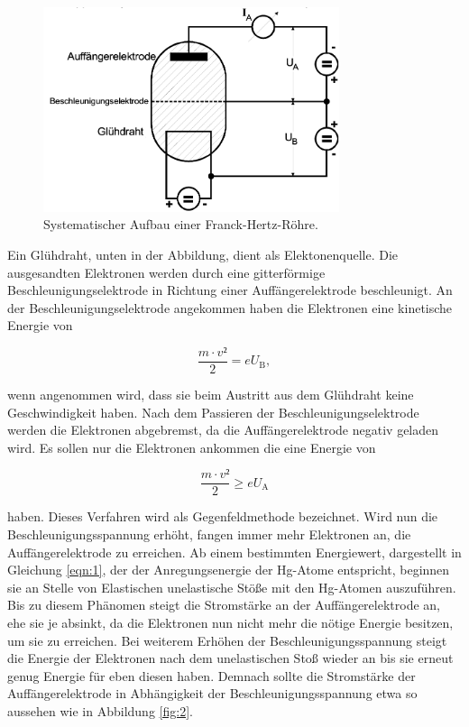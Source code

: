 \begin{figure}[H]
  \centering
  \includegraphics[height=6cm]{ressources/aufbau.png}
  \caption{Systematischer Aufbau einer Franck-Hertz-Röhre. \cite{skript}}
  \label{fig:1}
\end{figure}

Ein Glühdraht, unten in der Abbildung, dient als Elektonenquelle.
Die ausgesandten Elektronen werden durch eine gitterförmige Beschleunigungselektrode in Richtung einer Auffängerelektrode beschleunigt.
An der Beschleunigungselektrode angekommen haben die Elektronen eine kinetische Energie von

\begin{equation}
  \frac{m \cdot v²}{2} = eU_{\text{B}}, \label{eqn:3}
\end{equation}

wenn angenommen wird, dass sie beim Austritt aus dem Glühdraht keine Geschwindigkeit haben.
Nach dem Passieren der Beschleunigungselektrode werden die Elektronen abgebremst, da die Auffängerelektrode negativ geladen wird.
Es sollen nur die Elektronen ankommen die eine Energie von

\begin{equation}
  \frac{m \cdot v²}{2} \ge eU_{\text{A}} \label{eqn:4}
\end{equation}

haben.
Dieses Verfahren wird als Gegenfeldmethode bezeichnet.
Wird nun die Beschleunigungsspannung erhöht, fangen immer mehr Elektronen an, die Auffängerelektrode zu erreichen.
Ab einem bestimmten Energiewert, dargestellt in Gleichung \ref{eqn:1}, der der Anregungsenergie der Hg-Atome entspricht, beginnen sie an Stelle von Elastischen unelastische Stöße mit den Hg-Atomen auszuführen.
Bis zu diesem Phänomen steigt die Stromstärke an der Auffängerelektrode an, ehe sie je absinkt, da die Elektronen nun nicht mehr die nötige Energie besitzen, um sie zu erreichen.
Bei weiterem Erhöhen der Beschleunigungsspannung steigt die Energie der Elektronen nach dem unelastischen Stoß wieder an bis sie erneut genug Energie für eben diesen haben.
Demnach sollte die Stromstärke der Auffängerelektrode in Abhängigkeit der Beschleunigungsspannung etwa so aussehen wie in Abbildung \ref{fig:2}.

